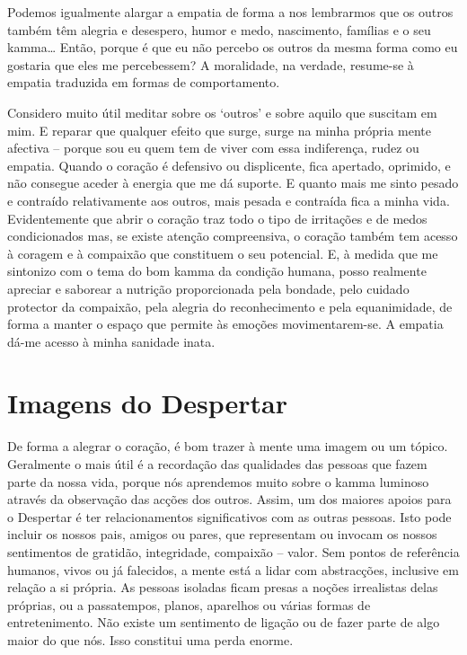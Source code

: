 Podemos igualmente alargar a empatia de forma a nos lembrarmos que os outros
também têm alegria e desespero, humor e medo, nascimento, famílias e o seu
kamma\ldots{} Então, porque é que eu não percebo os outros da mesma forma como
eu gostaria que eles me percebessem? A moralidade, na verdade, resume-se à
empatia traduzida em formas de comportamento.

Considero muito útil meditar sobre os `outros' e sobre aquilo que suscitam em
mim. E reparar que qualquer efeito que surge, surge na minha própria mente
afectiva -- porque sou eu quem tem de viver com essa indiferença, rudez ou
empatia. Quando o coração é defensivo ou displicente, fica apertado, oprimido, e
não consegue aceder à energia que me dá suporte. E quanto mais me sinto pesado e
contraído relativamente aos outros, mais pesada e contraída fica a minha vida.
Evidentemente que abrir o coração traz todo o tipo de irritações e de medos
condicionados mas, se existe atenção compreensiva, o coração também tem acesso à
coragem e à compaixão que constituem o seu potencial. E, à medida que me
sintonizo com o tema do bom kamma da condição humana, posso realmente apreciar e
saborear a nutrição proporcionada pela bondade, pelo cuidado protector da
compaixão, pela alegria do reconhecimento e pela equanimidade, de forma a manter
o espaço que permite às emoções movimentarem-se. A empatia dá-me acesso à minha
sanidade inata.

\section{Imagens do Despertar}

De forma a alegrar o coração, é bom trazer à mente uma imagem ou um tópico.
Geralmente o mais útil é a recordação das qualidades das pessoas que fazem parte
da nossa vida, porque nós aprendemos muito sobre o kamma luminoso através da
observação das acções dos outros. Assim, um dos maiores apoios para o Despertar
é ter relacionamentos significativos com as outras pessoas. Isto pode incluir os
nossos pais, amigos ou pares, que representam ou invocam os nossos sentimentos
de gratidão, integridade, compaixão -- valor. Sem pontos de referência humanos,
vivos ou já falecidos, a mente está a lidar com abstracções, inclusive em
relação a si própria. As pessoas isoladas ficam presas a noções irrealistas
delas próprias, ou a passatempos, planos, aparelhos ou várias formas de
entretenimento. Não existe um sentimento de ligação ou de fazer parte de algo
maior do que nós. Isso constitui uma perda enorme.

